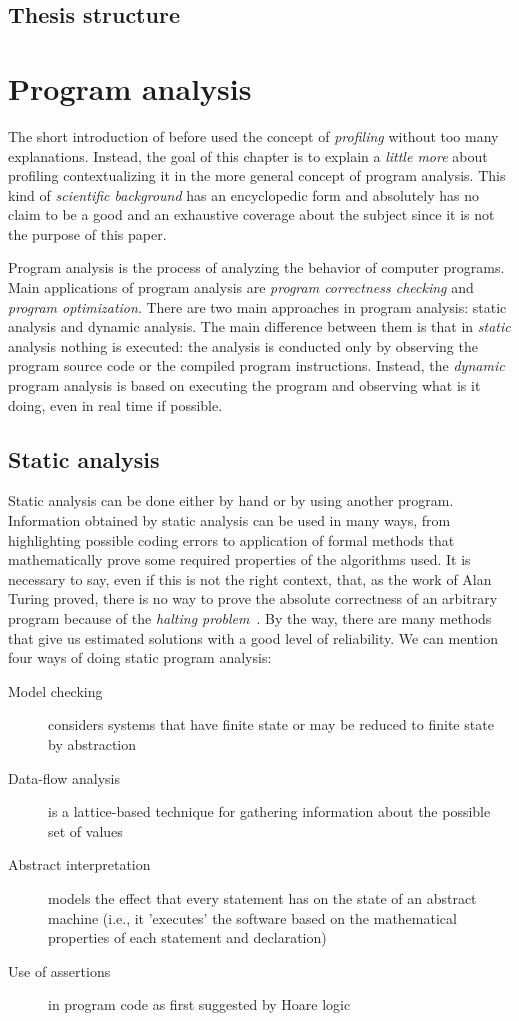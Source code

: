 \documentclass[a4paper,11pt]{report}
\begin{document}
\section{Thesis structure}

\chapter{Program analysis}
The short introduction of before used the concept of \emph{profiling} without
too many explanations.
Instead, the goal of this chapter is to explain a \emph{little more} about
profiling contextualizing it in the more general concept of program analysis.
This kind of \emph{scientific background} has an encyclopedic form and
absolutely has no claim to be a good and an exhaustive coverage about the
subject since it is not the purpose of this paper.

Program analysis is the process of analyzing the behavior of computer
programs. Main applications of program analysis are 
\emph{program correctness checking} and \emph{program optimization}.
There are two main approaches in program analysis: static analysis and dynamic analysis.
The main difference between them is that in \emph{static} analysis nothing is
executed: the analysis is conducted only by observing the program source code or
the compiled program instructions. Instead, the \emph{dynamic} program analysis
is based on executing the program and observing what is it doing, even in real
time if possible.

\section{Static analysis}

Static analysis can be done either by hand or by using another program.
Information obtained by static analysis can be used in many ways, from
highlighting possible coding errors to application of formal methods that
mathematically prove some required properties of the algorithms used. It is
necessary to say, even if this is not the right context, that, as the work of
Alan Turing proved, there is no way to prove the absolute
correctness of an arbitrary program because of the \emph{halting
problem}~\cite{Turing01}.
By the way, there are many methods that give us estimated solutions with a
good level of reliability. We can mention four ways of doing static program
analysis:


\begin{description}
\item[Model checking] considers systems that have finite state or may be reduced to finite state by abstraction
\item[Data-flow analysis] is a lattice-based technique for gathering information about the possible set of values
\item[Abstract interpretation] models the effect that every statement has on the
state of an abstract machine (i.e., it 'executes' the software based on the
mathematical properties of each statement and declaration)
\item[Use of assertions] in program code as first suggested by Hoare
logic~\cite{Hoare01}
\end{description}
\end{document}
